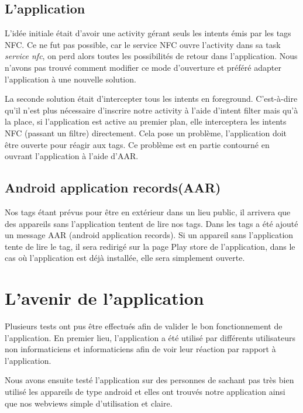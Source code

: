 \documentclass[a4paper,11pt]{article}
\begin{document}
      \subsection{L’application}
      L’idée initiale était d’avoir une activity gérant seuls les intents émis par les tags NFC. 
      Ce ne fut pas possible, car le service NFC ouvre l’activity dans sa task \textit{service nfc}, on perd alors toutes les possibilités de retour 
      dans l’application. 
      Nous n’avons pas trouvé comment modifier ce mode d’ouverture et préféré adapter l’application à une nouvelle solution.
      
      La seconde solution était d’intercepter tous les intents en foreground. 
      C'est-à-dire qu’il n’est plus nécessaire d’inscrire notre activity à l’aide d’intent filter mais qu’à la place, 
      si l’application est active au premier plan, elle interceptera les intents NFC (passant un filtre) directement. 
      Cela pose un problème, l’application doit être ouverte pour réagir aux tags. 
      Ce problème est en partie contourné en ouvrant l’application à l’aide d’AAR.
      
      \subsection{Android application records(AAR)}
      Nos tags étant prévus pour être en extérieur dans un lieu public, il arrivera que des appareils sans l’application tentent de lire nos tags. 
      Dans les tags a été ajouté un message AAR (android application records). 
      Si un appareil sans l’application tente de lire le tag, il sera redirigé sur la page Play store de l’application, 
      dans le cas où l’application est déjà installée, elle sera simplement ouverte.
    
		\section{L'avenir de l'application}
		
		Plusieurs tests ont pus être effectués afin de valider le bon fonctionnement de l'application. En premier lieu, l'application a été utilisé par différents utilisateurs non informaticiens et informaticiens afin de voir leur réaction par rapport à l'application.

		Nous avons ensuite testé l'application sur des personnes de sachant pas très bien utilisé les appareils de type android	et elles ont trouvés notre application ainsi que nos webviews simple d'utilisation et claire.
\end{document}
